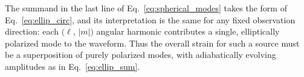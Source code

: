 \documentclass[aps,prd,twocolumn,superscriptaddress,preprintnumbers,floatfix,nofootinbib]{revtex4-2}
\newcommand*{\eq}[1]{Eq.~\eqref{eq:#1}}
\begin{document}
% 

The summand in the last line of \eq{spherical_modes} takes the form of \eq{ellip_circ}, and its interpretation is the same for any fixed observation direction: each $(\ell$, $|m|)$ angular harmonic contributes a single, elliptically polarized mode to the waveform.
Thus the overall strain for such a source must be a superposition of purely polarized modes, with adiabatically evolving amplitudes as in \eq{ellip_sum}.
\end{document}
